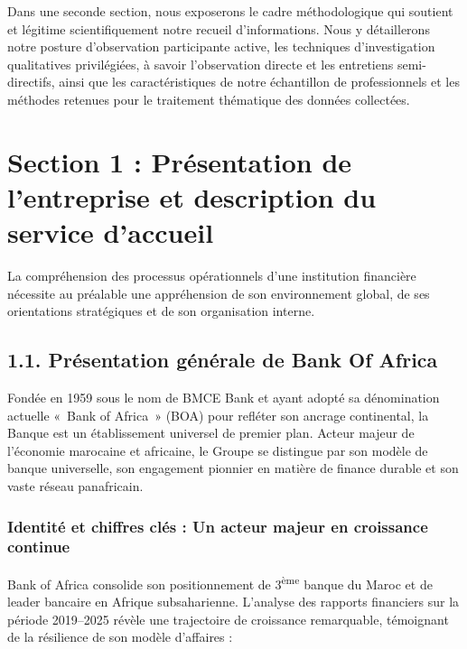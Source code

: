 Dans une seconde section, nous exposerons le cadre méthodologique qui soutient et légitime scientifiquement notre recueil d'informations. Nous y détaillerons notre posture d'observation participante active, les techniques d'investigation qualitatives privilégiées, à savoir l'observation directe et les entretiens semi-directifs, ainsi que les caractéristiques de notre échantillon de professionnels et les méthodes retenues pour le traitement thématique des données collectées.

\section*{Section 1 : Présentation de l'entreprise et description du service d'accueil}

La compréhension des processus opérationnels d'une institution financière nécessite au préalable une appréhension de son environnement global, de ses orientations stratégiques et de son organisation interne.

\subsection*{1.1. Présentation générale de Bank Of Africa}

Fondée en 1959 sous le nom de BMCE Bank et ayant adopté sa dénomination actuelle «~Bank of Africa~» (BOA) pour refléter son ancrage continental, la Banque est un établissement universel de premier plan. Acteur majeur de l'économie marocaine et africaine, le Groupe se distingue par son modèle de banque universelle, son engagement pionnier en matière de finance durable et son vaste réseau panafricain.

\subsubsection*{Identité et chiffres clés : Un acteur majeur en croissance continue}

Bank of Africa consolide son positionnement de 3\textsuperscript{ème} banque du Maroc et de leader bancaire en Afrique subsaharienne. L'analyse des rapports financiers sur la période 2019--2025 révèle une trajectoire de croissance remarquable, témoignant de la résilience de son modèle d'affaires :

